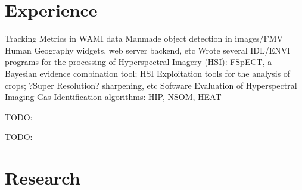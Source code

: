 \documentclass[letterpaper]{deedy-resume} %
\begin{document}
\begin{minipage}[t]{0.69\textwidth} %


\section{Experience}


Tracking Metrics in WAMI data
Manmade object detection in images/FMV
Human Geography widgets, web server backend, etc
Wrote several IDL/ENVI programs for the processing of Hyperspectral Imagery (HSI): FSpECT, a Bayesian evidence combination tool;  HSI Exploitation tools for the analysis of crops; ?Super Resolution? sharpening, etc
Software Evaluation of Hyperspectral Imaging Gas Identification algorithms: HIP, NSOM, HEAT \\

\vspace{\topsep} %
\begin{tightitemize}
\item TODO:
\end{tightitemize}

\sectionspace %



\begin{tightitemize}
\item TODO:
\end{tightitemize}

\sectionspace %



\section{Research}


\end{minipage}
\end{document}
